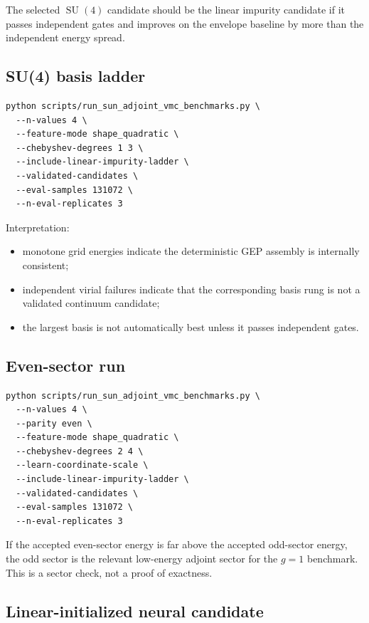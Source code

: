 \documentclass[11pt]{article}
\newcommand{\SU}{\operatorname{SU}}
\begin{document}
The selected \(\SU(4)\) candidate should be the linear impurity candidate if it passes independent gates and improves on the envelope baseline by more than the independent energy spread.

\subsection{SU(4) basis ladder}

\begin{lstlisting}[style=bashstyle]
python scripts/run_sun_adjoint_vmc_benchmarks.py \
  --n-values 4 \
  --feature-mode shape_quadratic \
  --chebyshev-degrees 1 3 \
  --include-linear-impurity-ladder \
  --validated-candidates \
  --eval-samples 131072 \
  --n-eval-replicates 3
\end{lstlisting}

Interpretation:
\begin{itemize}
\item monotone grid energies indicate the deterministic GEP assembly is internally consistent;
\item independent virial failures indicate that the corresponding basis rung is not a validated continuum candidate;
\item the largest basis is not automatically best unless it passes independent gates.
\end{itemize}

\subsection{Even-sector run}

\begin{lstlisting}[style=bashstyle]
python scripts/run_sun_adjoint_vmc_benchmarks.py \
  --n-values 4 \
  --parity even \
  --feature-mode shape_quadratic \
  --chebyshev-degrees 2 4 \
  --learn-coordinate-scale \
  --include-linear-impurity-ladder \
  --validated-candidates \
  --eval-samples 131072 \
  --n-eval-replicates 3
\end{lstlisting}

If the accepted even-sector energy is far above the accepted odd-sector energy, the odd sector is the relevant low-energy adjoint sector for the \(g=1\) benchmark. This is a sector check, not a proof of exactness.

\subsection{Linear-initialized neural candidate}
\end{document}
